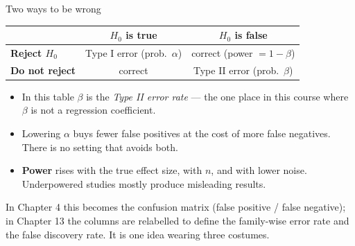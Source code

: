 \documentclass[aspectratio=169,11pt]{beamer}
\begin{document}
\begin{frame}{Two ways to be wrong}
  \footnotesize
  \begin{center}
  \begin{tabular}{@{}lcc@{}}
    \toprule
     & \textbf{$H_0$ is true} & \textbf{$H_0$ is false} \\
    \midrule
    \textbf{Reject $H_0$} & Type I error (prob.\ $\alpha$) & correct (power $=1-\beta$) \\
    \textbf{Do not reject} & correct & Type II error (prob.\ $\beta$) \\
    \bottomrule
  \end{tabular}
  \end{center}
  \begin{itemize}
    \item In this table $\beta$ is the \emph{Type II error rate} --- the one
          place in this course where $\beta$ is not a regression coefficient.
    \item Lowering $\alpha$ buys fewer false positives at the cost of more
          false negatives. There is no setting that avoids both.
    \item \textbf{Power} rises with the true effect size, with $n$, and with
          lower noise. Underpowered studies mostly produce misleading results.
  \end{itemize}
  \begin{takeaway}
    In Chapter 4 this becomes the confusion matrix (false positive / false
    negative); in Chapter 13 the columns are relabelled to define the family-wise
    error rate and the false discovery rate. It is one idea wearing three
    costumes.
  \end{takeaway}
\end{frame}
\end{document}
